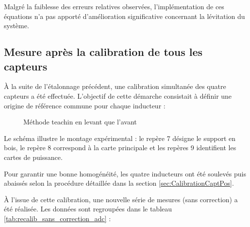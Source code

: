 Malgré la faiblesse des erreurs relatives observées, l'implémentation de ces équations n'a pas apporté d'amélioration significative concernant la lévitation du système.

\subsection{Mesure après la calibration de tous les capteurs}
À la suite de l'étalonnage précédent, une calibration simultanée des quatre capteurs a été effectuée. L'objectif de cette démarche consistait à définir une origine de référence commune pour chaque inducteur :

\begin{figure}[H]
    \centering
    
    \caption{Méthode teachin en levant que l'avant}
    \label{fig:DessinMaquetteCote}
\end{figure}

Le schéma illustre le montage expérimental : le repère 7 désigne le support en bois, le repère 8 correspond à la carte principale et les repères 9 identifient les cartes de puissance.

Pour garantir une bonne homogénéité, les quatre inducteurs ont été soulevés puis abaissés selon la procédure détaillée dans la section \ref{sec:CalibrationCaptPos}.

À l'issue de cette calibration, une nouvelle série de mesures (sans correction) a été réalisée. Les données sont regroupées dans le tableau \ref{tab:recalib_sans_correction_adc} :

